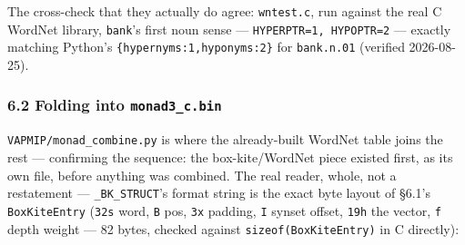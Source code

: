 \documentclass[
  10pt,
]{article}
\begin{document}
The cross-check that they actually do agree: \texttt{wntest.c}, run
against the real C WordNet library, \texttt{bank}'s first noun sense ---
\texttt{HYPERPTR=1,\ HYPOPTR=2} --- exactly matching Python's
\texttt{\{\textquotesingle{}hypernyms\textquotesingle{}:1,\textquotesingle{}hyponyms\textquotesingle{}:2\}}
for \texttt{bank.n.01} (verified 2026-08-25).

\hypertarget{folding-into-monad3_c.bin}{%
\subsubsection{\texorpdfstring{6.2 Folding into
\texttt{monad3\_c.bin}}{6.2 Folding into monad3\_c.bin}}\label{folding-into-monad3_c.bin}}

\texttt{VAPMIP/monad\_combine.py} is where the already-built WordNet
table joins the rest --- confirming the sequence: the box-kite/WordNet
piece existed first, as its own file, before anything was combined. The
real reader, whole, not a restatement --- \texttt{\_BK\_STRUCT}'s format
string is the exact byte layout of §6.1's \texttt{BoxKiteEntry}
(\texttt{32s} word, \texttt{B} pos, \texttt{3x} padding, \texttt{I}
synset offset, \texttt{19h} the vector, \texttt{f} depth weight --- 82
bytes, checked against \texttt{sizeof(BoxKiteEntry)} in C directly):
\end{document}
